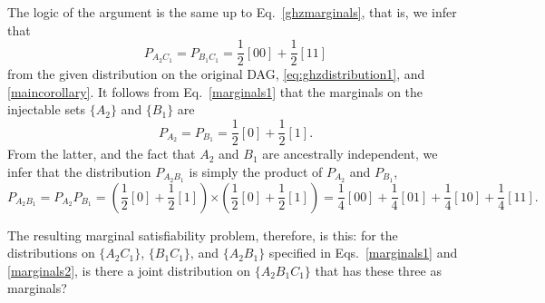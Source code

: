 \documentclass[aps,english,superscriptaddress,onecolumn,twoside,longbibliography,pra,floatfix,fleqn,nofootinbib]{revtex4-1}%
\theoremstyle{definition}
\newcommand{\cramp}[1]{\ensuremath{\mathord{#1}}}
\begin{document}
The logic of the argument is the same up to Eq.~\eqref{ghzmarginals}, that is, we infer that 
\begin{equation}
P_{A_2 C_1} = P_{B_1 C_1} = \frac{1}{2} [00] +\frac{1}{2} [11]\label{marginals1}
\end{equation}
from the given distribution on the original DAG, \cref{eq:ghzdistribution1}, and \cref{maincorollary}. 
It follows from Eq.~\eqref{marginals1} that the marginals on the injectable sets $\{ A_2\}$ and $\{ B_1\}$ are 
\begin{equation}
P_{A_2} = P_{B_1}=\frac{1}{2} [0] +\frac{1}{2} [1].
\end{equation}
From the latter, and the fact that $A_2$ and $B_1$ are ancestrally independent, we infer that the distribution $P_{A_2 B_1}$ is simply the product of $P_{A_2}$ and  $P_{B_1}$,
\begin{equation}
P_{A_2 B_1} = P_{A_2}P_{B_1} = \left(\frac{1}{2} [0] +\frac{1}{2} [1]\right)\cramp{\times}\left(\frac{1}{2} [0] +\frac{1}{2} [1]\right)=\frac{1}{4} [00]+\frac{1}{4} [01]+\frac{1}{4} [10]+\frac{1}{4} [11].
\label{marginals2}
\end{equation}



The resulting marginal satisfiability problem, therefore, is this: for the distributions on $\{A_2 C_1\}$, $\{B_1 C_1\}$, and $\{A_2 B_1\}$ specified in Eqs.~\eqref{marginals1} and \eqref{marginals2}, is there a joint distribution on  $\{ A_2 B_1 C_1\}$ that has these three as marginals?

\end{document}
